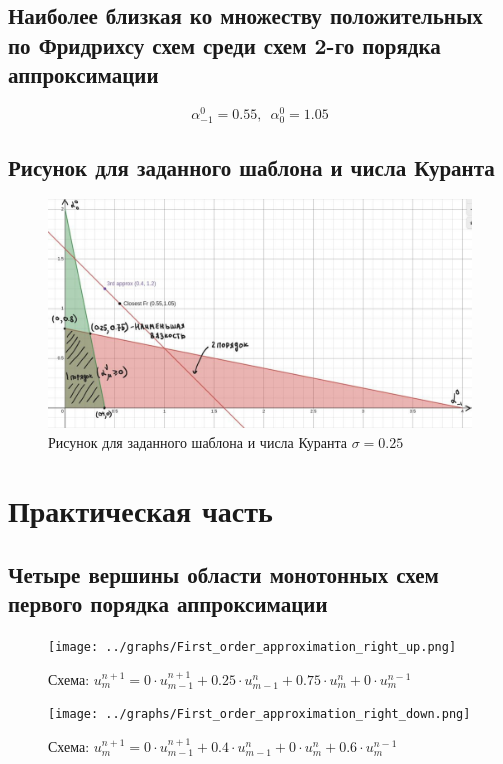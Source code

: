 \documentclass[a4paper, 12pt]{article} %
\begin{document}
\subsection{Наиболее близкая ко множеству положительных по Фридрихсу схем среди схем 2-го порядка аппроксимации}
\label{subsec:5t}
$$\alpha^{0}_{-1} = 0.55, \,\,\, \alpha^{0}_{0} = 1.05$$

\subsection{Рисунок для заданного шаблона и числа Куранта}
\label{subsec:6t}
\begin{figure}[h!]
    \centering
    \includegraphics[width=17cm]{risunok.jpg}
    \caption{Рисунок для заданного шаблона и числа Куранта $\sigma = 0.25$}
    \label{fig:vac}
\end{figure} 


\section{Практическая часть}
\subsection{Четыре вершины области монотонных схем первого порядка аппроксимации}
\label{subsec:1p}

\begin{figure}[h!]
    \centering
    \texttt{[image: ../graphs/First\_order\_approximation\_right\_up.png]}
    \caption{Схема: $u^{n+1}_{m} = 0 \cdot u^{n+1}_{m-1} + 0.25 \cdot u^{n}_{m-1} + 0.75 \cdot u^{n}_{m} + 0 \cdot u^{n-1}_{m}$}
    \label{fig:vac}
\end{figure} 


\begin{figure}[h!]
    \centering
    \texttt{[image: ../graphs/First\_order\_approximation\_right\_down.png]}
    \caption{Схема: $u^{n+1}_{m} = 0 \cdot u^{n+1}_{m-1} + 0.4 \cdot u^{n}_{m-1} + 0 \cdot u^{n}_{m} + 0.6 \cdot u^{n-1}_{m}$}
    \label{fig:vac}
\end{figure} 
\end{document}
